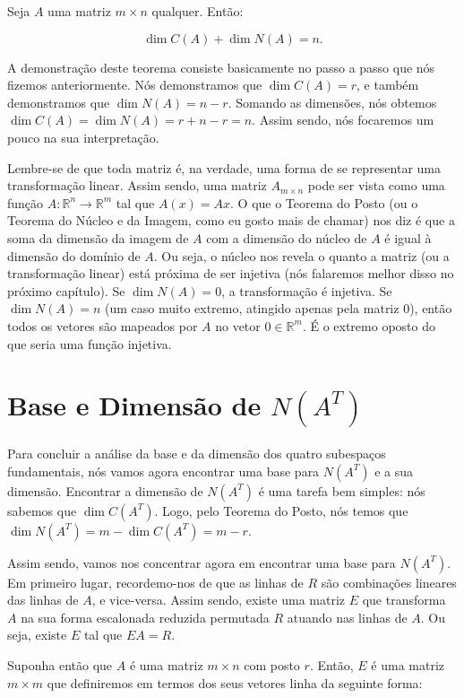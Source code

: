 \begin{Theorem}
	Seja $A$ uma matriz $m\times n$ qualquer. Então:
	
	$$
	\dim C(A) + \dim N(A) = n.
	$$
\end{Theorem}

A demonstração deste teorema consiste basicamente no passo a passo que nós fizemos anteriormente. Nós demonstramos que $\dim C(A) = r$, e também demonstramos que $\dim N(A) = n - r$. Somando as dimensões, nós obtemos $\dim C(A) = \dim N(A) = r + n - r = n$. Assim sendo, nós focaremos um pouco na sua interpretação.

Lembre-se de que toda matriz é, na verdade, uma forma de se representar uma transformação linear. Assim sendo, uma matriz $A_{m\times n}$ pode ser vista como uma função $A:\mathbb{R}^n\to\mathbb{R}^m$ tal que $A(x) = Ax$. O que o Teorema do Posto (ou o Teorema do Núcleo e da Imagem, como eu gosto mais de chamar) nos diz é que a soma da dimensão da imagem de $A$ com a dimensão do núcleo de $A$ é igual à dimensão do domínio de $A$. Ou seja, o núcleo nos revela o quanto a matriz (ou a transformação linear) está próxima de ser injetiva (nós falaremos melhor disso no próximo capítulo). Se $\dim N(A) = 0$, a transformação é injetiva. Se $\dim N(A) = n$ (um caso muito extremo, atingido apenas pela matriz $0$), então todos os vetores são mapeados por $A$ no vetor $0\in\mathbb{R}^m$. É o extremo oposto do que seria uma função injetiva.

\section{Base e Dimensão de $N(A^T)$}

Para concluir a análise da base e da dimensão dos quatro subespaços fundamentais, nós vamos agora encontrar uma base para $N(A^T)$ e a sua dimensão. Encontrar a dimensão de $N(A^T)$ é uma tarefa bem simples: nós sabemos que $\dim C(A^T)$. Logo, pelo Teorema do Posto, nós temos que $\dim N(A^T) = m - \dim C(A^T) = m - r$.

Assim sendo, vamos nos concentrar agora em encontrar uma base para $N(A^T)$. Em primeiro lugar, recordemo-nos de que as linhas de $R$ são combinações lineares das linhas de $A$, e vice-versa. Assim sendo, existe uma matriz $E$ que transforma $A$ na sua forma escalonada reduzida permutada $R$ atuando nas linhas de $A$. Ou seja, existe $E$ tal que $EA = R$.

Suponha então que $A$ é uma matriz $m\times n$ com posto $r$. Então, $E$ é uma matriz $m\times m$ que definiremos em termos dos seus vetores linha da seguinte forma:

